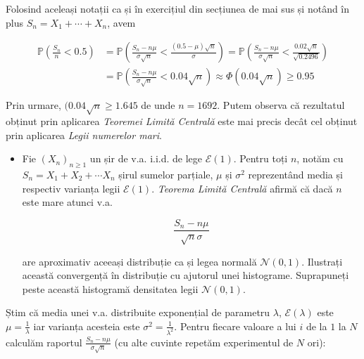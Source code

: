 \documentclass[]{article}
\newenvironment{frshaded*}{%
  \def\FrameCommand{\fboxrule=\FrameRule\fboxsep=\FrameSep \fcolorbox{framecolor}{shadecolor1}}%
  \MakeFramed {\advance\hsize-\width \FrameRestore}}%
{\endMakeFramed}
\newenvironment{rmdblock}[1]
  {\begin{frshaded*}
  \begin{itemize}
  \renewcommand{\labelitemi}{
    \raisebox{-.7\height}[0pt][0pt]{
      {\setkeys{Gin}{width=2em,keepaspectratio}\texttt{[image: images/icons/\#1]}}
    }
  }
  \item
  }
  {
  \end{itemize}
  \end{frshaded*}
  }
\newenvironment{rmdexercise}
  {\begin{rmdblock}{exercise}}
  {\end{rmdblock}}
\begin{document}
Folosind aceleași notații ca și în exercițiul din secțiunea de mai sus
și notând în plus \(S_n = X_1+\cdots+X_n\), avem

\begin{align*}
  \mathbb{P}\left(\frac{S_n}{n}<0.5\right) &= \mathbb{P}\left(\frac{S_n - n\mu}{\sigma\sqrt{n}}<\frac{(0.5-\mu)\sqrt{n}}{\sigma}\right)= \mathbb{P}\left(\frac{S_n - n\mu}{\sigma\sqrt{n}}<\frac{0.02\sqrt{n}}{\sqrt{0.2496}}\right) \\
  &= \mathbb{P}\left(\frac{S_n - n\mu}{\sigma\sqrt{n}}<0.04\sqrt{n}\right) \approx\Phi(0.04\sqrt{n})\geq 0.95
\end{align*}

Prin urmare, \((0.04\sqrt{n}\geq 1.645\) de unde \(n = 1692\). Putem
observa că rezultatul obținut prin aplicarea \emph{Teoremei Limită
Centrală} este mai precis decât cel obținut prin aplicarea \emph{Legii
numerelor mari}.

\begin{rmdexercise}
Fie \((X_n)_{n\geq1}\) un șir de v.a. i.i.d. de lege \(\mathcal{E}(1)\).
Pentru toți \(n\), notăm cu \(S_n=X_1+X_2+\cdots X_n\) șirul sumelor
parțiale, \(\mu\) și \(\sigma^2\) reprezentând media și respectiv
varianța legii \(\mathcal{E}(1)\). \emph{Teorema Limită Centrală} afirmă
că dacă \(n\) este mare atunci v.a.

\[
\frac{S_n-n\mu}{\sqrt{n}\sigma}
\]

are aproximativ aceeași distribuție ca și legea normală
\(\mathcal{N}(0,1)\). Ilustrați această convergență în distribuție cu
ajutorul unei histograme. Suprapuneți peste această histogramă
densitatea legii \(\mathcal{N}(0,1)\).
\end{rmdexercise}

Știm că media unei v.a. distribuite exponențial de parametru
\(\lambda\), \(\mathcal{E}(\lambda)\) este \(\mu=\frac{1}{\lambda}\) iar
varianța acesteia este \(\sigma^2=\frac{1}{\lambda^2}\). Pentru fiecare
valoare a lui \(i\) de la \(1\) la \(N\) calculăm raportul
\(\frac{S_n-n\mu}{\sigma\sqrt{n}}\) (cu alte cuvinte repetăm
experimentul de \(N\) ori):
\end{document}
